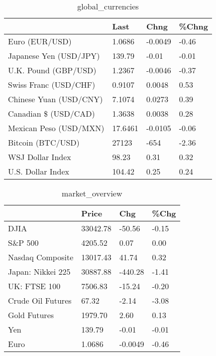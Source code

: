 \documentclass{article}%
\begin{document}
%


\begin{table}[htbp]%
\caption{global\_currencies}%
\centering%
\begin{adjustbox}{width=1\textwidth}%
\begin{tabular}{llll}
\toprule
                       &    Last &    Chng & \%Chng \\
\midrule
        Euro (EUR/USD) &  1.0686 & -0.0049 & -0.46 \\
Japanese Yen (USD/JPY) &  139.79 &   -0.01 & -0.01 \\
  U.K. Pound (GBP/USD) &  1.2367 & -0.0046 & -0.37 \\
 Swiss Franc (USD/CHF) &  0.9107 &  0.0048 &  0.53 \\
Chinese Yuan (USD/CNY) &  7.1074 &  0.0273 &  0.39 \\
  Canadian \$ (USD/CAD) &  1.3638 &  0.0038 &  0.28 \\
Mexican Peso (USD/MXN) & 17.6461 & -0.0105 & -0.06 \\
     Bitcoin (BTC/USD) &   27123 &    -654 & -2.36 \\
      WSJ Dollar Index &   98.23 &    0.31 &  0.32 \\
     U.S. Dollar Index &  104.42 &    0.25 &  0.24 \\
\bottomrule
\end{tabular}
%
\end{adjustbox}%
\end{table}

%


\begin{table}[htbp]%
\caption{market\_overview}%
\centering%
\begin{adjustbox}{width=1\textwidth}%
\begin{tabular}{llll}
\toprule
                  &    Price &     Chg &  \%Chg \\
\midrule
             DJIA & 33042.78 &  -50.56 & -0.15 \\
          S\&P 500 &  4205.52 &    0.07 &  0.00 \\
 Nasdaq Composite & 13017.43 &   41.74 &  0.32 \\
Japan: Nikkei 225 & 30887.88 & -440.28 & -1.41 \\
     UK: FTSE 100 &  7506.83 &  -15.24 & -0.20 \\
Crude Oil Futures &    67.32 &   -2.14 & -3.08 \\
     Gold Futures &  1979.70 &    2.60 &  0.13 \\
              Yen &   139.79 &   -0.01 & -0.01 \\
             Euro &   1.0686 & -0.0049 & -0.46 \\
\bottomrule
\end{tabular}
%
\end{adjustbox}%
\end{table}

%
\end{document}

